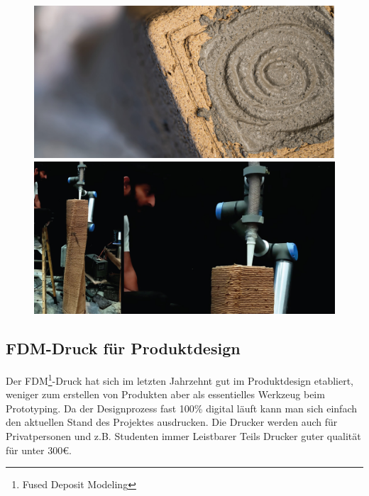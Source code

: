 \documentclass{article}
\begin{document}
    \begin{figure}[H]
        \begin{minipage}{0.4\textwidth}
           \centering
           \vfill
           \includegraphics[width=\linewidth]{figures/beispiele/kahn-2023-1.jpg}
           \caption{\parencite{kahn2023}}
           \label{fig:kahn-1}
        \end{minipage}
            \hfill
        \begin{minipage}{0.4\textwidth}
           \centering
           \vfill
           \includegraphics[width=\linewidth]{figures/beispiele/kahn-2023-2.jpg}
       \caption{\parencite{kahn2023}}
           \label{fig:kahn-2}
        \end{minipage}
    \end{figure}



\subsection{FDM-Druck f\"ur Produktdesign}
Der FDM\footnote{Fused Deposit Modeling}-Druck hat sich im letzten Jahrzehnt gut im
Produktdesign etabliert, weniger zum erstellen von Produkten aber als essentielles 
Werkzeug beim Prototyping. Da der Designprozess fast 100\% digital l\"auft kann man 
sich einfach den aktuellen Stand des Projektes ausdrucken. Die Drucker werden auch 
f\"ur Privatpersonen und z.B. Studenten immer Leistbarer Teils Drucker guter qualit\"at f\"ur
unter 300€.
\end{document}
